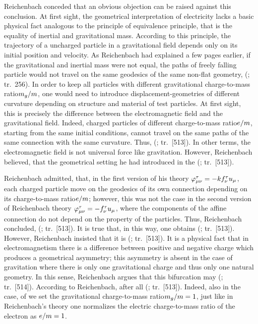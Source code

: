 \documentclass[submitted]{article}
\newcommand{\ctmr}{charge-to-mass ratio\xspace}
\newcommand{\ctmrf}{\ensuremath{\hfrac{e}{m}}\xspace}
\newcommand{\ctmrg}{\ensuremath{\hfrac{m_g}{m}}\xspace}
\newcommand{\RTo}{\ensuremath{\varphi\tmn=-k f^\tau_\nu u_\mu}\xspace}
\newcommand{\RTt}{\ensuremath{\varphi\tmn=-f^\tau_\nu u_\mu}\xspace}
\renewcommand{\me}{;~m.e.{}}
\renewcommand{\rzlp}[2]{(\cite[#1]{Reichenbach1928}; tr.\ #2)\xspace}
\renewcommand{\rzlap}[2]{(\cite[#1]{Reichenbach1928}; tr.\ [#2])\xspace}
\begin{document}
Reichenbach conceded that an obvious objection can be raised against this conclusion. At first sight, the geometrical interpretation of electricity lacks a basic physical fact analogous to the principle of equivalence principle, that is the equality of inertial and gravitational mass. According to this principle, the trajectory of a uncharged particle in a gravitational field depends only on its initial position and velocity. As Reichenbach had explained a few pages earlier, if the gravitational and inertial mass were not equal, the paths of freely falling particle would not travel on the same geodesics of the same non-flat \spti geometry,  \rzlp{293\me}{256}. In order to keep all particles with different gravitational \ctmr \ctmrg, one would need to introduce displacement-geometries of different curvature depending on structure and material of test particles. At first sight, this is precisely the difference between the electromagnetic field and the gravitational field. Indeed, charged particles of different \ctmr \ctmrf, starting from the same initial conditions, cannot travel on the same paths of the same connection with the same curvature. Thus,  \rzlap{367}{513}. In other terms, the electromagnetic field is not universal force like gravitation. However, Reichenbach believed, that the geometrical setting he had introduced in the \Ap {} \rzlap{367\me}{513}. 

Reichenbach admitted, that, in the first version of his theory \RTo, each charged particle move on the geodesics of its own connection depending on its \ctmr \ctmrf; however, this was not the case in the second version of Reichenbach theory \RTt, where the components of the affine connection do not depend on the property of the particles. Thus, Reichenbach concluded,  \rzlap{367}{513}. It is true that, in this way, one obtains  \rzlap{367}{513}. However, Reichenbach insisted that it is  \rzlap{367}{513}. It is a physical fact that in electromagnetism there is a difference between positive and negative charge which produces a geometrical asymmetry; this asymmetry is absent in the case of gravitation where there is only one gravitational charge and thus only one natural geometry. In this sense, Reichenbach argues that this bifurcation may  \rzlap{367\me}{514}. According to Reichenbach, after all \rzlap{367}{513}. Indeed, also in the case, of \gr we set the gravitational \ctmr $\ctmrg=1$, just like in Reichenbach's theory one normalizes the electric \ctmr of the electron as $\ctmrf = 1$.
\end{document}
